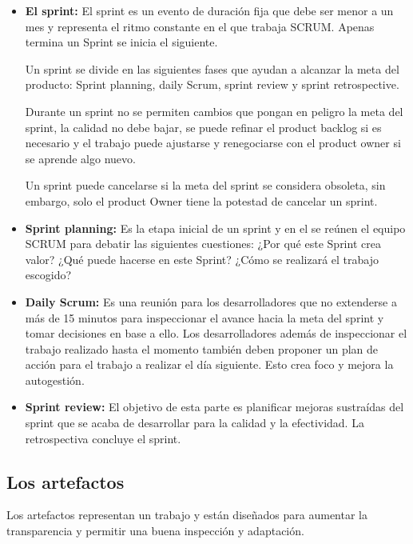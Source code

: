 \begin{itemize}
    \item \textbf{El sprint:} El sprint es un evento de duración fija que debe ser menor a un mes y representa el ritmo constante en el que trabaja SCRUM. Apenas termina un Sprint se inicia el siguiente.

    Un sprint se divide en las siguientes fases que ayudan a alcanzar la meta del producto: Sprint planning, daily Scrum, sprint review y sprint retrospective.

    Durante un sprint no se permiten cambios que pongan en peligro la meta del sprint, la calidad no debe bajar, se puede refinar el product backlog si es necesario y el trabajo puede ajustarse y renegociarse con el product owner si se aprende algo nuevo.

    Un sprint puede cancelarse si la meta del sprint se considera obsoleta, sin embargo, solo el product Owner tiene la potestad de cancelar un sprint.

    \item \textbf{Sprint planning:} Es la etapa inicial de un sprint y en el se reúnen el equipo SCRUM para debatir las siguientes cuestiones: ¿Por qué este Sprint crea valor? ¿Qué puede hacerse en este Sprint? ¿Cómo se realizará el trabajo escogido?
    
    \item \textbf{Daily Scrum:} Es una reunión para los desarrolladores que no extenderse a más de 15 minutos para inspeccionar el avance hacia la meta del sprint y tomar decisiones en base a ello. Los desarrolladores además de inspeccionar el trabajo realizado hasta el momento también deben proponer un plan de acción para el trabajo a realizar el día siguiente. Esto crea foco y mejora la autogestión.

    \item \textbf{Sprint review:} El objetivo de esta parte es planificar mejoras sustraídas del sprint que se acaba de desarrollar para la calidad y la efectividad. La retrospectiva concluye el sprint.

\end{itemize}

\subsection{Los artefactos}
Los artefactos representan un trabajo y están diseñados para aumentar la transparencia y permitir una buena inspección y adaptación. 

